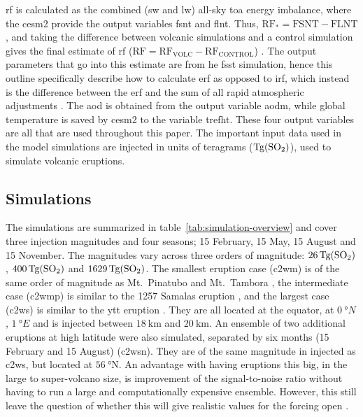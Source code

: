 \documentclass{ametsocV6.1}
\newcommand{\iso}[1][i]{{#1}njected \ce{SO2}}
\begin{document}
\gls{rf} is calculated as the combined (\gls{sw} and \gls{lw}) all-sky \gls{toa} energy
imbalance, where the \gls{cesm2} provide the output variables \gls{fsnt} and \gls{flnt}.
Thus, \(\mathrm{RF_*}= \mathrm{FSNT} - \mathrm{FLNT}\), and taking the difference
between volcanic simulations and a control simulation gives the final estimate of
\gls{rf} (\(\mathrm{RF}=\mathrm{RF_{VOLC}}-\mathrm{RF_{CONTROL}}\))
\citep{marshall2020}. The output parameters that go into this estimate are from he
\gls{fsst} simulation, hence this outline specifically describe how to calculate
\gls{erf} as opposed to \gls{irf}, which instead is the difference between the \gls{erf}
and the sum of all rapid atmospheric adjustments \citep{marshall2020,smith2018}. The
\gls{aod} is obtained from the output variable \gls{aodm}, while global temperature is
saved by \gls{cesm2} to the variable \gls{trefht}. These four output variables are all
that are used throughout this paper. The important input data used in the model
simulations are \iso{} in units of teragrams (\(\si{\tera\gram(\ce{SO2})}\)), used to
simulate volcanic eruptions.

\subsection{Simulations}

The simulations are summarized in table~\ref{tab:simulation-overview} and cover three
 injection magnitudes and four seasons; 15 February, 15 May, 15 August and 15
November. The magnitudes vary across three orders of magnitude:
\(\SI{26}{\tera\gram(\ce{SO2})}\), \(\SI{400}{\tera\gram(\ce{SO2})}\) and
\(\SI{1629}{\tera\gram(\ce{SO2})}\). The smallest eruption case (\gls{c2wm}) is of the
same order of magnitude as Mt.\ Pinatubo
\citep[\(\sim10\)--\(\SI{20}{\tera\gram(\ce{SO2})}\);~e.g.][]{timmreck2018} and Mt.\
Tambora \citep[\(\sim\SI{56.2}{\tera\gram(\ce{SO2})}\);~e.g.][]{zanchettin2016}, the
intermediate case (\gls{c2wmp}) is similar to the 1257 Samalas eruption
\citep[\(\sim{118.8}\)--\(\SI{173.1}{\tera\gram(\ce{SO2})}\);~e.g.][]{toohey2017,ottobliesner2016},
and the largest case (\gls{c2ws}) is similar to the \gls{ytt} eruption
\citep[\(100\)--\(\SI{10000}{\tera\gram()}\);~e.g.][]{jones2005}. They are all
located at the equator, at \(\SI{0}{\degree N}\), \(\SI{1}{\degree E}\) and \ce{SO2} is
injected between \(\SI{18}{\kilo\meter}\) and \(\SI{20}{\kilo\meter}\). An ensemble of
two additional eruptions at high latitude were also simulated, separated by six months
(15 February and 15 August) (\gls{c2wsn}). They are of the same magnitude in \iso{} as
\gls{c2ws}, but located at \(\SI{56}{\degree \mathrm{N}}\). An advantage with having
eruptions this big, in the large to super-volcano size, is improvement of the
signal-to-noise ratio without having to run a large and computationally expensive
ensemble. However, this still leave the question of whether this will give realistic
values for the forcing open \citep{gregory2016}.
\end{document}
